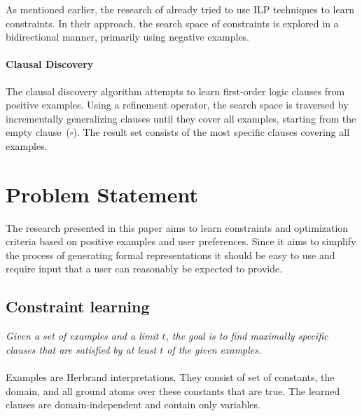 \documentclass[letterpaper]{article}
\theoremstyle{definition}
\begin{document}
As mentioned earlier, the research of \cite{Lallouet:LearningCP} already tried to use ILP techniques to learn constraints.
In their approach, the search space of constraints is explored in a bidirectional manner, primarily using negative examples.

\paragraph{Clausal Discovery}
The clausal discovery algorithm \cite{DeRaedt:ClausalDiscovery} attempts to learn first-order logic clauses from positive examples.
Using a refinement operator, the search space is traversed by incrementally generalizing clauses until they cover all examples, starting from the empty clause~($\square$).
The result set consists of the most specific clauses covering all examples.



\section{Problem Statement}
The research presented in this paper aims to learn constraints and optimization criteria based on positive examples and user preferences.
Since it aims to simplify the process of generating formal representations it should be easy to use and require input that a user can reasonably be expected to provide.

\subsection{Constraint learning}
\emph{Given a set of examples and a limit $t$, the goal is to find maximally specific clauses that are satisfied by at least $t$ of the given examples.}
\\\\
Examples are Herbrand interpretations.
They consist of set of constants, the domain, and all ground atoms over these constants that are true.
The learned clauses are domain-independent and contain only variables.
\end{document}
